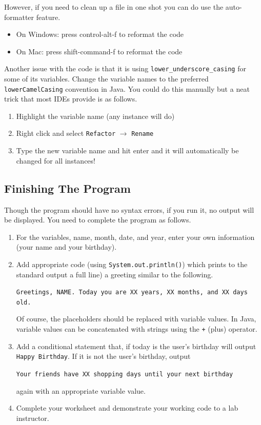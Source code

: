 \documentclass[12pt]{scrartcl}
\begin{document}
However, if you need to clean up a file in one shot you can do use the
auto-formatter feature.  

\begin{itemize}
  \item On Windows: press control-alt-f to reformat the code
  \item On Mac: press shift-command-f to reformat the code
\end{itemize}

Another issue with the code is that it is using \texttt{lower_underscore_casing} for some of its variables.  Change the 
variable names to the preferred \texttt{lowerCamelCasing} 
convention in Java.  You could do this manually but a neat trick that
most IDEs provide is as follows.

\begin{enumerate}
  \item Highlight the variable name (any instance will do)
  \item Right click and select \texttt{Refactor} $\rightarrow$ \texttt{Rename}
  \item Type the new variable name and hit enter and it will automatically be changed for all instances!  
\end{enumerate}

\subsection{Finishing The Program}

Though the program should have no syntax errors, if you run it, no 
output will be displayed.  You need to complete the program as follows.

\begin{enumerate}
  \item For the variables, name, month, date, and year, enter your 
  	own information (your name and your birthday).
  \item Add appropriate code (using \texttt{System.out.println()})
    which prints to the standard output a full line) a greeting similar
    to the following. 
    
    \texttt{Greetings, NAME.  Today you are XX years, 
    XX months, and XX days old.}  
    
    Of course, the placeholders should
    be replaced with variable values.  In Java, variable values can be
    concatenated with strings using the \texttt{+} (plus) 
    operator.
  \item Add a conditional statement that, if today is the user's birthday 
    will output \texttt{Happy Birthday}.  If it is not the 
    user's birthday, output 
    
    \texttt{Your friends have XX shopping days until your next birthday} 
    
    again with an appropriate variable
    value.
  \item Complete your worksheet and demonstrate your working code to a 
  	lab instructor.
\end{enumerate}
\end{document}
